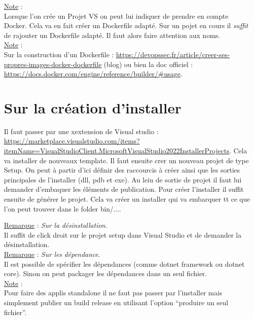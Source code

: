 \documentclass[a4paper,12pt,twoside]{article}
\newcommand{\incode}[1]{{\footnotesize\ttfamily #1}} %
\newcommand{\rem}[2]{\noindent\underline{Remarque} : \textit{#1}.\\ \indent #2}
\newcommand{\note}[1]{\noindent\underline{Note} : \\ \indent #1}
\begin{document}
\note{Lorsque l'on crée un Projet VS on peut lui indiquer de prendre en compte Docker. Cela va en fait créer un Dockerfile adapté. Sur un pojet en cours il \textit{suffit} de rajouter un Dockerfile adapté. Il faut alors faire attention aux noms.}\\

\note{Sur la construction d'un Dockerfile : \url{https://devopssec.fr/article/creer-ses-propres-images-docker-dockerfile} (blog) ou bien la doc officiel : \url{https://docs.docker.com/engine/reference/builder/\#usage}.}\\

\section{Sur la création d'installer}

Il faut passer par une xextension de Visual studio : \url{https://marketplace.visualstudio.com/items?itemName=VisualStudioClient.MicrosoftVisualStudio2022InstallerProjects}. Cela va installer de nouveaux template. Il faut ensuite crer un nouveau projet de type Setup. On peut à partir d'ici définir des raccourcis à créer ainsi que les sorties principales de l'installer (dll, pdb et exe). Au leiu de sortie de projet il faut lui demander d'embaquer les éléments de publication. Pour créer l'installer il suffit ensuite de générer le projet.
Cela va créer un installer qui va embarquer tt ce que l'on peut trouver dans le folder \incode{bin/...}.

\rem{Sur la désinstallation}{Il suffit de click droit sur le projet setup dans Visual Studio et de demander la désinstallation.}\\

\rem{Sur les dépendance}{Il est possible de spécifier les dépendances (comme dotnet framework ou dotnet core). Sinon on peut packager les dépendances dans un seul fichier.}\\

\note{Pour faire des applis standalone il ne faut pas passer par l'installer mais simplement publier un build release en utilisant l'option ``produire un seul fichier''.}\\

\end{document}
